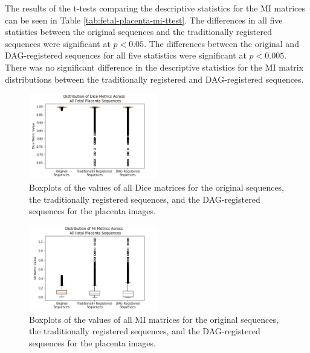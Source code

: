The results of the t-tests comparing the descriptive statistics for the MI matrices can be seen in Table \ref{tab:fetal-placenta-mi-ttest}. The differences in all five statistics between the original sequences and the traditionally registered sequences were significant at $p < 0.05$. The differences between the original and DAG-registered sequences for all five statistics were significant at $p < 0.005$. There was no significant difference in the descriptive statistics for the MI matrix distributions between the traditionally registered and DAG-registered sequences.


\begin{figure}
\centering
\includegraphics[width=0.5\textwidth]{6/figures/fetal-placenta-dice-box.png}
\caption{Boxplots of the values of all Dice matrices for the original sequences, the traditionally registered sequences, and the DAG-registered sequences for the placenta images.}
\label{fig:fetal-placenta-dice-box}
\end{figure}

\begin{figure}[h]
\centering
\includegraphics[width=0.5\textwidth]{6/figures/fetal-placenta-mi-box.png}
\caption{Boxplots of the values of all MI matrices for the original sequences, the traditionally registered sequences, and the DAG-registered sequences for the placenta images.}
\label{fig:fetal-placenta-mi-box}
\end{figure}

